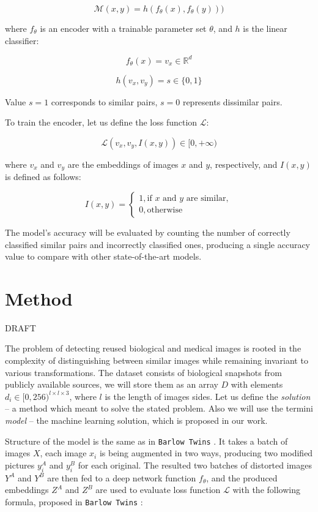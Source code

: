 \documentclass{article}
\begin{document}
$$ \mathcal{M}(x, y) = h(f_{\theta}(x), f_{\theta}(y))) $$

where $f_{\theta}$ is an encoder with a trainable parameter set $\theta$, and 
$h$ is the linear classifier:

$$ f_{\theta}(x) = v_x \in \mathbb{R}^{d} $$

$$ h(v_x, v_y) = s \in \{0, 1\} $$

Value $s = 1$ corresponds to similar pairs, $s = 0$ represents dissimilar pairs.

To train the encoder, let us define the loss function $\mathcal{L}$:

$$ \mathcal{L}(v_x, v_y, I(x, y)) \in [0, +\infty) $$

where $v_x$ and $v_y$ are the embeddings of images $x$ and $y$, respectively, 
and $I(x, y)$ is defined as follows:

$$ I(x, y) = \begin{cases} 
1, \text{if $x$ and $y$ are similar}, \\
0, \text{otherwise}
\end{cases} $$

The model's accuracy will be evaluated by counting the number of correctly classified similar pairs 
and incorrectly classified ones, producing a single accuracy value to compare with other 
state-of-the-art models.

\section{Method}

DRAFT

The problem of detecting reused biological and medical images is rooted in the complexity of
distinguishing between similar images while remaining invariant to various transformations.
The dataset consists of biological snapshots from publicly available sources, we will 
store them as an array $D$ with elements $d_i \in [0, 256)^{l \times l \times 3}$, where 
$l$ is the length of images sides. 
Let us define the \textit{solution} -- a method which meant to solve the stated problem.
Also we will use the termini \textit{model} -- the machine learning solution, which is 
proposed in our work.

Structure of the model is the same as in \texttt{Barlow Twins} \cite{zbontar2021barlow}.
It takes a batch of images $X$, each image $x_i$ is being augmented in two ways, producing 
two modified pictures $y_i^A$ and $y_i^B$ for each original. 
The resulted two batches of distorted images $Y^A$ and $Y^B$ are then
fed to a deep network function $f_{\theta}$, and the produced embeddings $Z^A$ and $Z^B$ 
are used to evaluate loss function $\mathcal{L}$ with the following formula, proposed in 
\texttt{Barlow Twins} \cite{zbontar2021barlow}:
\end{document}
